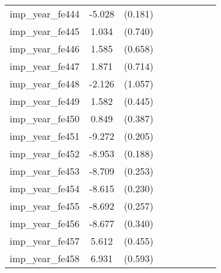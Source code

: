 {\begin{tabular}{l*{4}{cc}}
imp\_year\_fe444&   -5.028\sym{***}&  (0.181)&                  &         &                  &         &                  &         \\
imp\_year\_fe445&    1.034         &  (0.740)&                  &         &                  &         &                  &         \\
imp\_year\_fe446&    1.585\sym{*}  &  (0.658)&                  &         &                  &         &                  &         \\
imp\_year\_fe447&    1.871\sym{**} &  (0.714)&                  &         &                  &         &                  &         \\
imp\_year\_fe448&   -2.126\sym{*}  &  (1.057)&                  &         &                  &         &                  &         \\
imp\_year\_fe449&    1.582\sym{***}&  (0.445)&                  &         &                  &         &                  &         \\
imp\_year\_fe450&    0.849\sym{*}  &  (0.387)&                  &         &                  &         &                  &         \\
imp\_year\_fe451&   -9.272\sym{***}&  (0.205)&                  &         &                  &         &                  &         \\
imp\_year\_fe452&   -8.953\sym{***}&  (0.188)&                  &         &                  &         &                  &         \\
imp\_year\_fe453&   -8.709\sym{***}&  (0.253)&                  &         &                  &         &                  &         \\
imp\_year\_fe454&   -8.615\sym{***}&  (0.230)&                  &         &                  &         &                  &         \\
imp\_year\_fe455&   -8.692\sym{***}&  (0.257)&                  &         &                  &         &                  &         \\
imp\_year\_fe456&   -8.677\sym{***}&  (0.340)&                  &         &                  &         &                  &         \\
imp\_year\_fe457&    5.612\sym{***}&  (0.455)&                  &         &                  &         &                  &         \\
imp\_year\_fe458&    6.931\sym{***}&  (0.593)&                  &         &                  &         &                  &         \\

\end{tabular}}
